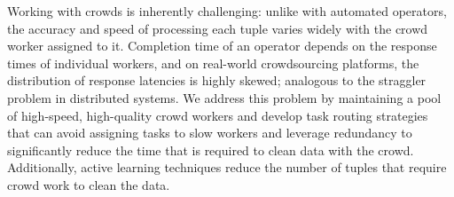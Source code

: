 

Working with crowds is inherently challenging: unlike with automated operators, the accuracy and speed of processing each tuple varies widely with the crowd worker assigned to it.
Completion time of an operator depends on the response times of individual workers, and on real-world crowdsourcing 
platforms, the distribution of response latencies is highly skewed; analogous to the straggler problem in distributed systems.
We address this problem by maintaining a pool of high-speed, high-quality crowd workers and develop task routing strategies 
that can avoid assigning tasks to slow workers and leverage redundancy to significantly reduce the time that is required to clean 
data with the crowd. Additionally, active learning techniques reduce the number of tuples that require crowd work to clean the
data.

